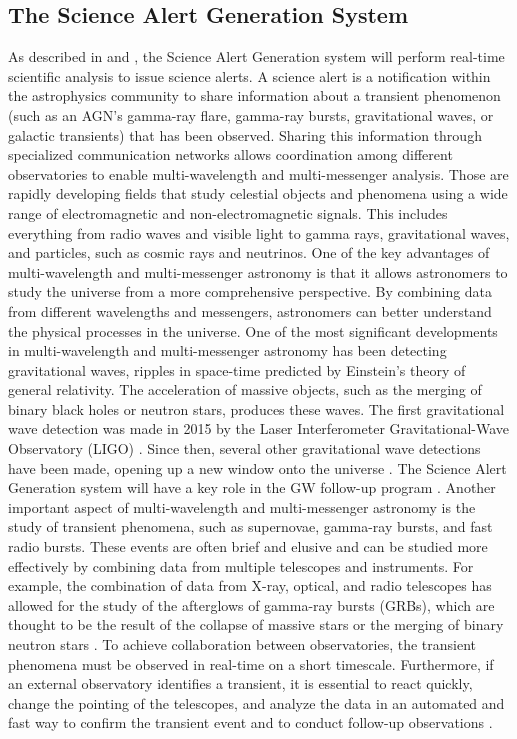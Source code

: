 \subsection{The Science Alert Generation System}
\label{s:sag}
As described in \cite{bulgarelli2015on} and \cite{Bulgarelli_2021}, the Science Alert Generation system will perform real-time scientific analysis to issue science alerts. A science alert is a notification within the astrophysics community to share information about a transient phenomenon (such as an AGN's gamma-ray flare, gamma-ray bursts, gravitational waves, or galactic transients) that has been observed. Sharing this information through specialized communication networks allows coordination among different observatories to enable multi-wavelength and multi-messenger analysis. Those are rapidly developing fields that study celestial objects and phenomena using a wide range of electromagnetic and non-electromagnetic signals. This includes everything from radio waves and visible light to gamma rays, gravitational waves, and particles, such as cosmic rays and neutrinos. One of the key advantages of multi-wavelength and multi-messenger astronomy is that it allows astronomers to study the universe from a more comprehensive perspective. By combining data from different wavelengths and messengers, astronomers can better understand the physical processes in the universe. One of the most significant developments in multi-wavelength and multi-messenger astronomy has been detecting gravitational waves, ripples in space-time predicted by Einstein's theory of general relativity. The acceleration of massive objects, such as the merging of binary black holes or neutron stars, produces these waves. The first gravitational wave detection was made in 2015 by the Laser Interferometer Gravitational-Wave Observatory (LIGO) \cite{gw_061102}. Since then, several other gravitational wave detections have been made, opening up a new window onto the universe \cite{abbott2016observation}. The Science Alert Generation system will have a key role in the GW follow-up program \cite{seglar2019gravitational}. Another important aspect of multi-wavelength and multi-messenger astronomy is the study of transient phenomena, such as supernovae, gamma-ray bursts, and fast radio bursts. These events are often brief and elusive and can be studied more effectively by combining data from multiple telescopes and instruments. For example, the combination of data from X-ray, optical, and radio telescopes has allowed for the study of the afterglows of gamma-ray bursts (GRBs), which are thought to be the result of the collapse of massive stars or the merging of binary neutron stars \cite{Fishman1995}.
To achieve collaboration between observatories, the transient phenomena must be observed in real-time on a short timescale. Furthermore, if an external observatory identifies a transient, it is essential to react quickly, change the pointing of the telescopes, and analyze the data in an automated and fast way to confirm the transient event and to conduct follow-up observations \cite{Bulgarelli_2021}. 

